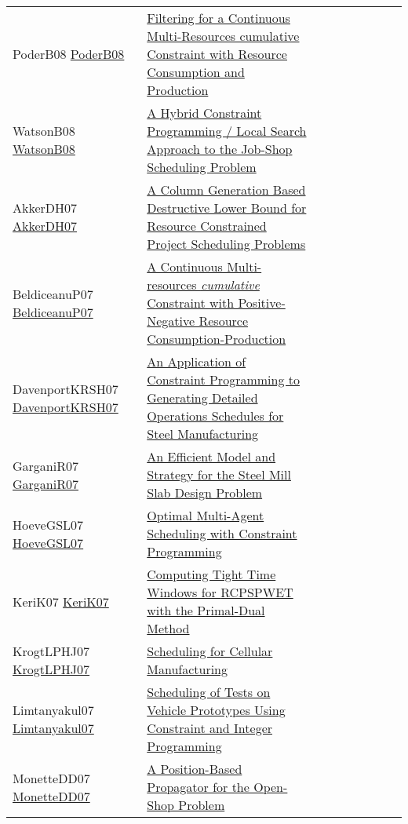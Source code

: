 {\begin{longtable}{p{3cm}p{7cm}lllllll}
PoderB08 \href{http://www.aaai.org/Library/ICAPS/2008/icaps08-033.php}{PoderB08} &  \href{papers/PoderB08.pdf}{Filtering for a Continuous Multi-Resources cumulative Constraint with Resource Consumption and Production} &  &  &  &  &  &  & \\
WatsonB08 \href{https://doi.org/10.1007/978-3-540-68155-7\_21}{WatsonB08} &  \href{papers/WatsonB08.pdf}{A Hybrid Constraint Programming / Local Search Approach to the Job-Shop Scheduling Problem} &  &  &  &  &  &  & \\
AkkerDH07 \href{https://doi.org/10.1007/978-3-540-72397-4\_27}{AkkerDH07} &  \href{papers/AkkerDH07.pdf}{A Column Generation Based Destructive Lower Bound for Resource Constrained Project Scheduling Problems} &  &  &  &  &  &  & \\
BeldiceanuP07 \href{https://doi.org/10.1007/978-3-540-72397-4\_16}{BeldiceanuP07} &  \href{papers/BeldiceanuP07.pdf}{A Continuous Multi-resources \emph{cumulative} Constraint with Positive-Negative Resource Consumption-Production} &  &  &  &  &  &  & \\
DavenportKRSH07 \href{https://doi.org/10.1007/978-3-540-74970-7\_7}{DavenportKRSH07} &  \href{papers/DavenportKRSH07.pdf}{An Application of Constraint Programming to Generating Detailed Operations Schedules for Steel Manufacturing} &  &  &  &  &  &  & \\
GarganiR07 \href{https://doi.org/10.1007/978-3-540-74970-7\_8}{GarganiR07} &  \href{papers/GarganiR07.pdf}{An Efficient Model and Strategy for the Steel Mill Slab Design Problem} &  &  &  &  &  &  & \\
HoeveGSL07 \href{http://www.aaai.org/Library/AAAI/2007/aaai07-291.php}{HoeveGSL07} &  \href{papers/HoeveGSL07.pdf}{Optimal Multi-Agent Scheduling with Constraint Programming} &  &  &  &  &  &  & \\
KeriK07 \href{https://doi.org/10.1007/978-3-540-72397-4\_10}{KeriK07} &  \href{papers/KeriK07.pdf}{Computing Tight Time Windows for {RCPSPWET} with the Primal-Dual Method} &  &  &  &  &  &  & \\
KrogtLPHJ07 \href{https://doi.org/10.1007/978-3-540-74970-7\_10}{KrogtLPHJ07} &  \href{papers/KrogtLPHJ07.pdf}{Scheduling for Cellular Manufacturing} &  &  &  &  &  &  & \\
Limtanyakul07 \href{https://doi.org/10.1007/978-3-540-77903-2\_65}{Limtanyakul07} &  \href{papers/Limtanyakul07.pdf}{Scheduling of Tests on Vehicle Prototypes Using Constraint and Integer Programming} &  &  &  &  &  &  & \\
MonetteDD07 \href{https://doi.org/10.1007/978-3-540-72397-4\_14}{MonetteDD07} &  \href{papers/MonetteDD07.pdf}{A Position-Based Propagator for the Open-Shop Problem} &  &  &  &  &  &  & \\

\end{longtable}}
